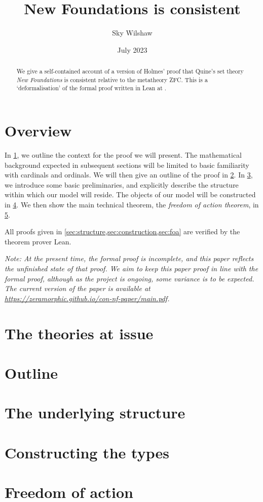 \documentclass{article}
\title{New Foundations is consistent}
\author{Sky Wilshaw}
\date{July 2023}
\theoremstyle{definition}
\theoremstyle{remark}
\begin{document}
\maketitle

\begin{abstract}
	We give a self-contained account of a version of Holmes' proof \cite{holmes2023nf} that Quine's set theory \emph{New Foundations} \cite{quine-nf} is consistent relative to the metatheory ZFC.
	This is a `deformalisation' of the formal proof written in Lean at \cite{leanprover-community-con-nf}.
\end{abstract}

\tableofcontents

\section*{Overview}

In \cref{sec:theories}, we outline the context for the proof we will present.
The mathematical background expected in subsequent sections will be limited to basic familiarity with cardinals and ordinals.
We will then give an outline of the proof in \cref{sec:outline}.
In \cref{sec:structure}, we introduce some basic preliminaries, and explicitly describe the structure within which our model will reside.
The objects of our model will be constructed in \cref{sec:construction}.
We then show the main technical theorem, the \emph{freedom of action theorem}, in \cref{sec:foa}.

All proofs given in \cref{sec:structure,sec:construction,sec:foa} are verified by the theorem prover Lean.

\emph{
	Note: At the present time, the formal proof \cite{leanprover-community-con-nf} is incomplete, and this paper reflects the unfinished state of that proof.
	We aim to keep this paper proof in line with the formal proof, although as the project is ongoing, some variance is to be expected.
	The current version of the paper is available at \url{https://zeramorphic.github.io/con-nf-paper/main.pdf}.
}

\section{The theories at issue}
\label{sec:theories}


\section{Outline}
\label{sec:outline}


\section{The underlying structure}
\label{sec:structure}


\section{Constructing the types}
\label{sec:construction}


\section{Freedom of action}
\label{sec:foa}


\printbibliography
\end{document}
